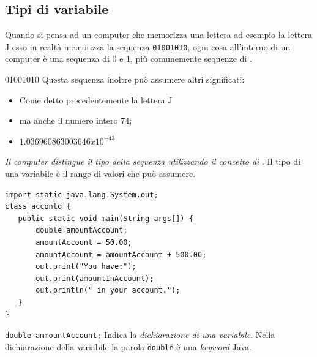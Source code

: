 \subsection*{Tipi di variabile}
\begin{frame}
\begin{block}{}
Quando si pensa ad un computer che memorizza una lettera ad esempio la lettera J esso in realtà memorizza la sequenza 
\texttt{01001010}, ogni cosa all'interno di un computer è una sequenza di 0 e 1, più comunemente sequenze di .
\end{block}
\begin{block}{01001010}
Questa sequenza inoltre può assumere altri significati:
\begin{itemize}
\item Come detto precedentemente la lettera J
\item ma anche il numero intero 74;
\item $1.036960863003646 x 10^{-43}$
\end{itemize}
\end{block}
\begin{block}{}
\textit{Il computer distingue il tipo della sequenza utilizzando il concetto di }. Il tipo di una variabile è
il range di valori che può assumere.
\end{block}
\end{frame}

\begin{frame}[fragile]
\begin{lstlisting}
import static java.lang.System.out;
class acconto {
   public static void main(String args[]) {
       double amountAccount;
       amountAccount = 50.00;
       amountAccount = amountAccount + 500.00;
       out.print("You have:");
       out.print(amountInAccount);
       out.println(" in your account.");
   }	
}
\end{lstlisting}
\begin{block}{}
\texttt{double ammountAccount;}
Indica la \textit{dichiarazione di una variabile}. Nella dichiarazione della variabile la parola \texttt{double} è 
una \textit{keyword} Java.
\end{block}
\end{frame}

